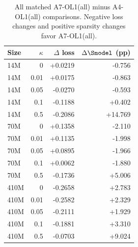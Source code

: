 \begin{table}[p]\centering\small\renewcommand{\arraystretch}{0.95}
\caption{All matched A7-OL1(all) minus A4-OL1(all) comparisons. Negative loss changes and positive sparsity changes favor A7-OL1(all).}\label{tab:scale-pairs-full}
\begin{tabular}{@{}lrrr@{}}
\toprule
Size & $\kappa$ & $\Delta$ loss & $\Delta\Smodel$ (pp) \\
\midrule
14M & 0 & +0.0219 & -0.756 \\
14M & 0.01 & +0.0175 & -0.863 \\
14M & 0.05 & -0.0270 & -0.593 \\
14M & 0.1 & -0.1188 & +0.402 \\
14M & 0.5 & -0.2086 & +14.769 \\
70M & 0 & +0.1358 & -2.110 \\
70M & 0.01 & +0.1135 & -1.998 \\
70M & 0.05 & +0.0895 & -1.966 \\
70M & 0.1 & +0.0062 & -1.880 \\
70M & 0.5 & -0.1736 & +5.006 \\
410M & 0 & -0.2658 & +2.783 \\
410M & 0.01 & -0.2582 & +2.329 \\
410M & 0.05 & -0.2111 & +1.929 \\
410M & 0.1 & -0.1881 & +3.310 \\
410M & 0.5 & -0.0703 & +9.024 \\
\bottomrule
\end{tabular}
\end{table}
